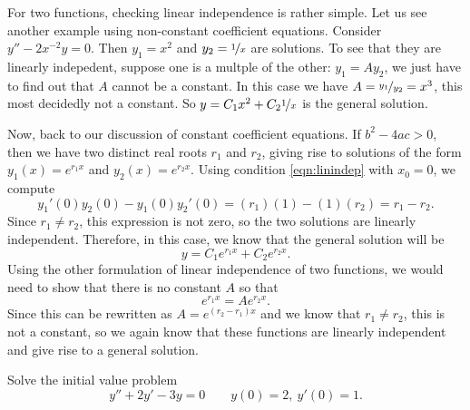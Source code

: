 For two functions, checking linear independence is rather simple.  Let us
see another example using non-constant coefficient equations.  Consider $y''-2x^{-2}y = 0$.  Then $y_1 = x^2$ and $y_2 =
\nicefrac{1}{x}$ are solutions.  To see that they are linearly indepedent,
suppose one is a multple of the other: $y_1 = A y_2$, we just have to find
out that $A$ cannot be a constant.  In this case we have $A =
\nicefrac{y_1}{y_2} = x^3$, this most decidedly not a constant.
So $y = C_1 x^2 + C_2 \nicefrac{1}{x}$ is the general solution.

\medskip

Now, back to our discussion of constant coefficient equations. If $b^2 - 4ac > 0$, then we have two distinct real roots $r_1$ and $r_2$, giving rise to solutions of the form $y_1(x) = e^{r_1x}$ and $y_2(x) = e^{r_2x}$. Using condition \ref{eqn:linindep} with $x_0 = 0$, we compute
\begin{equation*}
y_1'(0)y_2(0) - y_1(0)y_2'(0) = (r_1)(1) - (1)(r_2) = r_1 - r_2.
\end{equation*}
Since $r_1 \neq r_2$, this expression is not zero, so the two solutions are linearly independent. Therefore, in this case, we know that the general solution will be
\begin{equation*}
y = C_1e^{r_1x} + C_2e^{r_2x}.
\end{equation*}
Using the other formulation of linear independence of two functions, we would need to show that there is no constant $A$ so that 
\[ e^{r_1x} = A e^{r_2x}. \] Since this can be rewritten as $A = e^{(r_2-r_1)x}$ and we know that $r_1 \neq r_2$, this is not a constant, so we again know that these functions are linearly independent and give rise to a general solution.

\begin{example}
Solve the initial value problem
\begin{equation*}
y'' + 2y' - 3y = 0 \qquad y(0) = 2,\ y'(0) = 1. 
\end{equation*}
\end{example}

